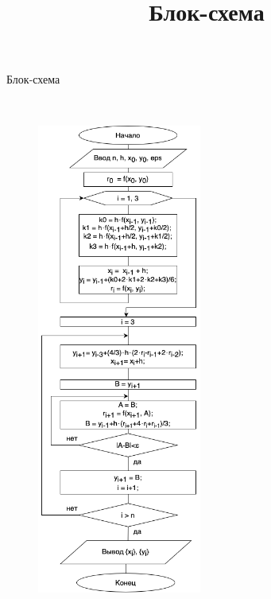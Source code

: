\newpage

\title{Блок-схема}{\begin{center}
    Блок-схема
\end{center}} \\
\begin{figure}[H]
\includegraphics[width = 0.48\textwidth]{comp-math-lab4.png}
 
\end{figure} 

\newpage

